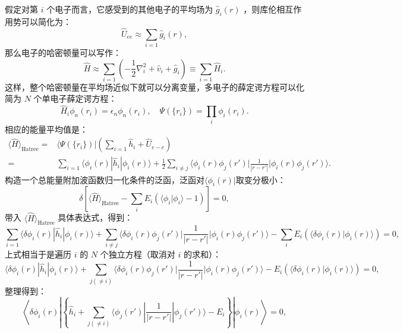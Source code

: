 假定对第 $i$ 个电子而言，它感受到的其他电子的平均场为 $\hat{g}_i(r)$ ，则库伦相互作用势可以简化为：
\begin{equation}
\hat{U}_{ee}\approx\sum_{i=1}\hat{g}_i(r),
\end{equation}
那么电子的哈密顿量可以写作：
\begin{equation}
\hat{H}\approx\sum_{i=1}\left(-\frac{1}{2}\nabla_i^2+\hat{v}_i+\hat{g}_i\right)\equiv\sum_{i=1}\hat{H}_i.
\end{equation}
这样，整个哈密顿量在平均场近似下就可以分离变量，多电子的薛定谔方程可以化简为 $N$ 个单电子薛定谔方程：
\begin{equation}
\hat{H}_i\phi_n(r_i)=\epsilon_n\phi_n(r_i),\quad \Psi(\{r_i\})=\prod_i \phi_i(r_i).
\end{equation}
相应的能量平均值是：
\begin{equation}
\begin{aligned}
\langle\hat{H} \rangle_{\mathrm{Hatree}}=&\langle\Psi(\{r_i\})|\left(\sum_{i=1}\hat{h}_i+\hat{U}_{e-e} \right)\\
=&\sum_{i=1}\langle\phi_i(r)|\hat{h}_i|\phi_i(r)\rangle+\frac{1}{2}\sum_{i\ne j}\langle\phi_i(r)\phi_j(r')\Big|\frac{1}{|r-r'|}\Big|\phi_i(r)\phi_j(r')\rangle.
\end{aligned}
\end{equation}
构造一个总能量附加波函数归一化条件的泛函，泛函对$\langle \phi_i(r)|$取变分极小：
\begin{equation}
\delta\left[ \langle\hat{H}\rangle_{\mathrm{Hatree}} -\sum_i E_i \left( \langle\phi_i|\phi_i\rangle-1\right)\right]=0,
\end{equation}
带入 $\langle\hat{H}\rangle_{\mathrm{Hatree}}$ 具体表达式，得到：
\begin{equation}
\sum_{i=1}\langle\delta \phi_i(r)|\hat{h}_i|\phi_i(r) \rangle+\sum_{i\ne j}\langle\delta \phi_i(r)\phi_j(r')\Big|\frac{1}{|r-r'|} \Big|\phi_i(r)\phi_j(r') \rangle-\sum_iE_i\left(\langle\delta\phi_i(r)|\phi_i(r) \rangle \right)=0,
\end{equation}
上式相当于是遍历 $i$ 的 $N$ 个独立方程（取消对 $i$ 的求和）：
\begin{equation}
\langle\delta \phi_i(r)|\hat{h}_i|\phi_i(r) \rangle+\sum_{j(\ne i)}\langle\delta \phi_i(r)\phi_j(r')\Big|\frac{1}{|r-r'|} \Big|\phi_i(r)\phi_j(r') \rangle-E_i\left(\langle\delta\phi_i(r)|\phi_i(r) \rangle \right)=0,
\end{equation}
整理得到：
\begin{equation}
\left\langle\delta\phi_i(r)\left|\left\{\hat{h}_i+\sum_{j(\ne i)}\langle\phi_j(r')|\frac{1}{|r-r'|}|\phi_j(r') \rangle-E_i \right\} \right|\phi_i(r) \right\rangle=0,
\end{equation}
